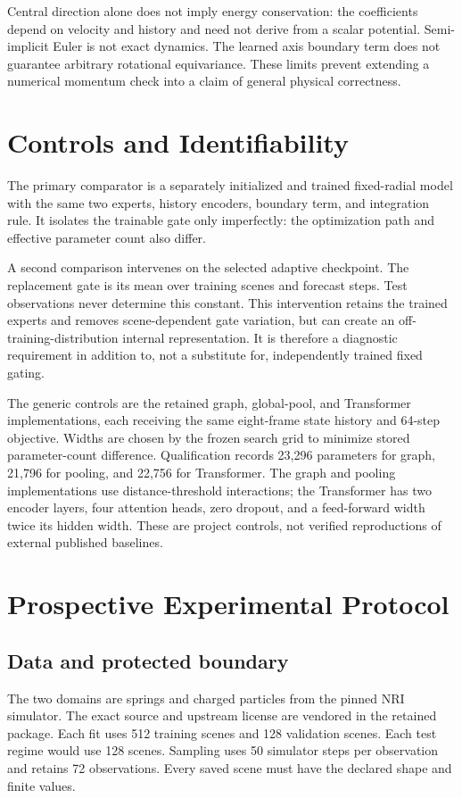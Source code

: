 \documentclass[10pt]{article}
\begin{document}
Central direction alone does not imply energy conservation: the coefficients depend on velocity and history and need not derive from a scalar potential. Semi-implicit Euler is not exact dynamics. The learned axis boundary term does not guarantee arbitrary rotational equivariance. These limits prevent extending a numerical momentum check into a claim of general physical correctness.

\section{Controls and Identifiability}
The primary comparator is a separately initialized and trained fixed-radial model with the same two experts, history encoders, boundary term, and integration rule. It isolates the trainable gate only imperfectly: the optimization path and effective parameter count also differ.

A second comparison intervenes on the selected adaptive checkpoint. The replacement gate is its mean over training scenes and forecast steps. Test observations never determine this constant. This intervention retains the trained experts and removes scene-dependent gate variation, but can create an off-training-distribution internal representation. It is therefore a diagnostic requirement in addition to, not a substitute for, independently trained fixed gating.

The generic controls are the retained graph, global-pool, and Transformer implementations, each receiving the same eight-frame state history and 64-step objective. Widths are chosen by the frozen search grid to minimize stored parameter-count difference. Qualification records 23,296 parameters for graph, 21,796 for pooling, and 22,756 for Transformer. The graph and pooling implementations use distance-threshold interactions; the Transformer has two encoder layers, four attention heads, zero dropout, and a feed-forward width twice its hidden width. These are project controls, not verified reproductions of external published baselines.

\section{Prospective Experimental Protocol}
\subsection{Data and protected boundary}
The two domains are springs and charged particles from the pinned NRI simulator. The exact source and upstream license are vendored in the retained package. Each fit uses 512 training scenes and 128 validation scenes. Each test regime would use 128 scenes. Sampling uses 50 simulator steps per observation and retains 72 observations. Every saved scene must have the declared shape and finite values.
\end{document}
